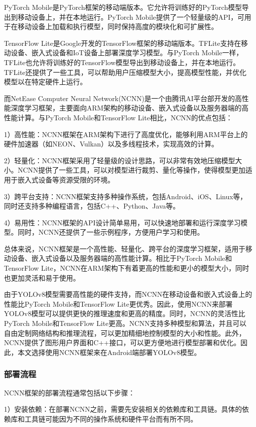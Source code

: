 \documentclass{ctexart}
\numberwithin{equation}{section}%
\numberwithin{figure}{section}%
\numberwithin{table}{section}%
\begin{document}
	PyTorch Mobile是PyTorch框架的移动端版本。它允许将训练好的PyTorch模型导出到移动设备上，并在本地运行。PyTorch Mobile提供了一个轻量级的API，可用于在移动设备上加载和执行模型，同时保持高度的模块化和可扩展性。
	
	TensorFlow Lite是Google开发的TensorFlow框架的移动端版本。TFLite支持在移动设备、嵌入式设备和IoT设备上部署深度学习模型。与PyTorch Mobile一样，TFLite也允许将训练好的TensorFlow模型导出到移动设备上，并在本地运行。TFLite还提供了一些工具，可以帮助用户压缩模型大小，提高模型性能，并优化模型以在特定硬件上运行。
	
	而NetEase Computer Neural Network(NCNN)是一个由腾讯AI平台部开发的高性能深度学习框架，主要面向ARM架构的移动设备、嵌入式设备以及服务器端的高性能计算。与PyTorch Mobile和TensorFlow Lite相比，NCNN的优点包括：
	
	1）高性能：NCNN框架在ARM架构下进行了高度优化，能够利用ARM平台上的硬件加速器（如NEON、Vulkan）以及多线程技术，实现高效的计算。
	
	2）轻量化：NCNN框架采用了轻量级的设计思路，可以非常有效地压缩模型大小。NCNN提供了一些工具，可以对模型进行裁剪、量化等操作，使得模型更加适用于嵌入式设备等资源受限的环境。
	
	3）跨平台支持：NCNN框架支持多种操作系统，包括Android、iOS、Linux等，同时还支持多种编程语言，包括C++、Python、Java等。
	
	4）易用性：NCNN框架的API设计简单易用，可以快速地部署和运行深度学习模型。同时，NCNN还提供了一些示例程序，方便用户学习和使用。
	
	总体来说，NCNN框架是一个高性能、轻量化、跨平台的深度学习框架，适用于移动设备、嵌入式设备以及服务器端的高性能计算。相比于PyTorch Mobile和TensorFlow Lite，NCNN在ARM架构下有着更高的性能和更小的模型大小，同时也更加灵活和易于使用。
	
	由于YOLOv8模型需要高性能的硬件支持，而NCNN在移动设备和嵌入式设备上的性能比PyTorch Mobile和TensorFlow Lite更优秀。因此，使用NCNN来部署YOLOv8模型可以提供更快的推理速度和更高的精度。同时，NCNN的灵活性比PyTorch Mobile和TensorFlow Lite更高。NCNN支持多种模型和算法，并且可以自由定制网络结构和推理流程，可以更加精细地控制模型的大小和性能。此外，NCNN提供了图形用户界面和C++接口，可以更方便地进行模型部署和优化。因此，本文选择使用NCNN框架来在Android端部署YOLOv8模型。
	
	\subsubsection{部署流程}
	NCNN框架的部署流程通常包括以下步骤：
	
	1）安装依赖：在部署NCNN之前，需要先安装相关的依赖库和工具链。具体的依赖库和工具链可能因为不同的操作系统和硬件平台而有所不同。
	
\end{document}
